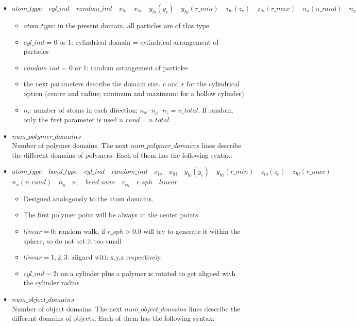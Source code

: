 \documentclass[a4paper,10pt]{scrreprt}
\begin{document}
\begin{itemize}
\item $ atom\_type \quad cyl\_ind \quad random\_ind \quad x_{lo} \quad x_{hi} \quad y_{lo}(y_c) \quad y_{hi}(r\_min) \quad z_{lo}(z_c) \quad z_{hi}(r\_max) \quad n_x(n\_rand) \quad n_y \quad n_z $
	\begin{itemize}
	\item $atom\_type$: in the present domain, all particles are of this type
	\item $cyl\_ind$ = 0 or 1: cylindrical domain = cylindrical arrangement of particles
	\item $random\_ind$ = 0 or 1: random arrangement of particles
	\item the next parameters describe the domain size. $c$ and $r$ for the cylindrical option (centre and radius; minimum and maximum: for a hollow cylinder)
	\item $n_i$: number of atoms in each direction; $n_x \cdot n_y \cdot n_z = n\_total$. If random, only the first parameter is used $n\_rand = n\_total$.
	\end{itemize}

\item $num\_polymer\_domains$ \\
	{Number of polymer domains. The next $num\_polymer\_domains$ lines describe the different domains of polymers. Each of them has the following syntax:}

\item $ atom\_type \quad bond\_type \quad cyl\_ind \quad random\_ind \quad x_{lo} \quad x_{hi} \quad y_{lo}(y_c) \quad y_{hi}(r\_min) \quad z_{lo}(z_c) \quad z_{hi}(r\_max)$\\$ n_x(n\_rand) \quad n_y \quad n_z \quad bead\_num \quad r_{eq} \quad r\_sph \quad linear$
	\begin{itemize}
	\item Designed analogously to the atom domains.
	\item The first polymer point will be always at the center points.
	\item $linear = 0$: random walk, if $r\_sph>0.0$ will try to generate it within the sphere, so do not set it too small
	\item $linear = 1,2,3$: aligned with x,y,z respectively.
	\item $cyl\_ind = 2$: on a cylinder plus a polymer is rotated to get aligned with the cylinder radius
	\end{itemize}

\item $num\_object\_domains$ \\
	{Number of object domains. The next $num\_object\_domains$ lines describe the different domains of objects. Each of them has the following syntax:}


\end{itemize}
\end{document}
